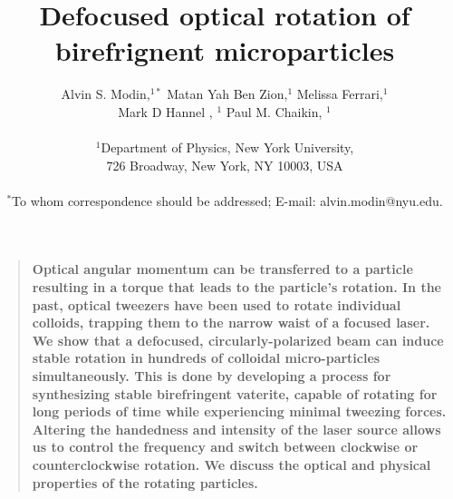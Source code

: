 \documentclass[12pt]{article}
\title{ Defocused optical rotation of birefrignent microparticles    }
\author
{Alvin S. Modin,$^{1\ast}$ Matan Yah Ben Zion,$^{1}$ Melissa Ferrari,$^{1}$ \\ Mark D Hannel , $^{1}$ Paul M. Chaikin, $^{1}$\\
\\
\normalsize{$^{1}$Department of Physics, New York University,}\\
\normalsize{726 Broadway, New York, NY 10003, USA}\\
\\
\normalsize{$^\ast$To whom correspondence should be addressed; E-mail:  alvin.modin@nyu.edu.}
}
\date{}
\newenvironment{sciabstract}{%
\begin{quote} \bf}
{\end{quote}}
\begin{document}
 


\baselineskip24pt


\maketitle 




\begin{sciabstract}
Optical angular momentum can be transferred to a particle resulting in a torque that leads to the particle's rotation. In the past, optical tweezers have been used to rotate individual colloids, trapping them to the narrow waist of a focused laser. We show that a defocused, circularly-polarized beam can induce stable rotation in hundreds of colloidal micro-particles simultaneously. This is done by developing a process for synthesizing stable birefringent vaterite, capable of rotating for long periods of time while experiencing minimal tweezing forces. Altering the handedness and intensity of the laser source allows us to control the frequency and switch between clockwise or counterclockwise rotation. We discuss the optical and physical properties of the rotating particles.
\end{sciabstract}



\end{document}
